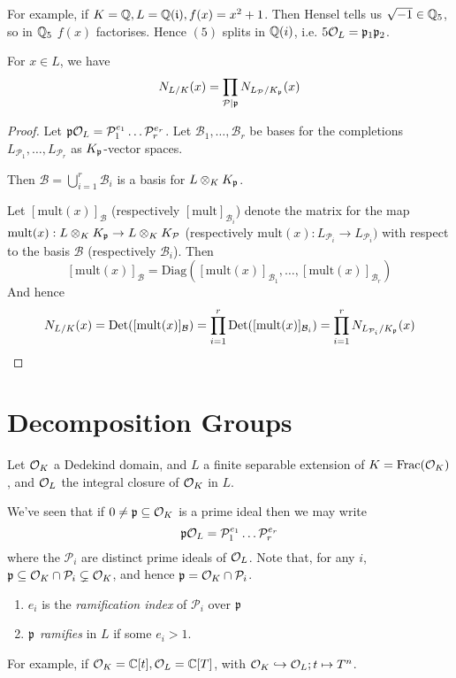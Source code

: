 \documentclass[10pt,a4paper]{article}
\begin{document}
For example, if $K = \mathbb{Q}, L= \mathbb{Q}(\mathfrak{i}), f(x) = x^2+1$. Then Hensel tells us $\sqrt{-1} \in \mathbb{Q}_5$, so in $\mathbb{Q}_5$ $f(x)$ factorises. Hence $(5)$ splits in $\mathbb{Q}(i)$, i.e. $5 \mathcal{O}_L = \mathfrak{p}_1\mathfrak{p}_2$.
\begin{corollary}
  For $x \in L$, we have
  \[N_{L/K}(x) = \prod_{\mathcal{P}|\mathfrak{p}} N_{L_{\mathcal{P}}/K_{\mathfrak{p}}}(x)\]
\end{corollary}
\begin{proof}
  Let $\mathfrak{p}\mathcal{O}_L = \mathcal{P}_1^{e_1} \ldots \mathcal{P}_r^{e_r}$. Let $\mathcal{B}_1, \ldots, \mathcal{B}_r$ be bases for the completions $L_{\mathcal{P}_1}, \ldots, L_{\mathcal{P}_r}$ as $K_{\mathfrak{p}}$-vector spaces.

  Then $\mathcal{B} = \bigcup_{i=1}^r \mathcal{B}_i$ is a basis for $L \otimes_K K_{\mathfrak{p}}$.

  Let $[\text{mult}(x)]_\mathcal{B}$ (respectively $[\text{mult}]_{\mathcal{B}_i}$) denote the matrix for the map $\text{mult}(x):L\otimes_K K_{\mathfrak{p}} \to L\otimes_K K_\mathcal{P}$ (respectively $\text{mult}(x):L_{\mathcal{P}_i} \to L_{\mathcal{P}_i})$ with respect to the basis $\mathcal{B}$ (respectively $\mathcal{B}_i$). Then
  \[[\text{mult}(x)]_\mathcal{B} = \text{Diag}([\text{mult}(x)]_{\mathcal{B_1}}, \ldots, [\text{mult}(x)]_{\mathcal{B}_r})\]
  And hence
  \[N_{L/K}(x) = \operatorname{Det}([\text{mult}(x)]_\mathcal{B}) = \prod_{i=1}^r \operatorname{Det}([\text{mult}(x)]_{\mathcal{B}_i}) = \prod_{i=1}^r N_{L_{\mathcal{P}_i}/K_{\mathfrak{p}}}(x)\]
\end{proof}
\section{Decomposition Groups}
Let $\mathcal{O}_K$ a Dedekind domain, and $L$ a finite separable extension of $K = \operatorname{Frac}(\mathcal{O}_K)$, and $\mathcal{O}_L$ the integral closure of $\mathcal{O}_K$ in $L$.

We've seen that if $0 \neq \mathfrak{p} \subseteq \mathcal{O}_K$ is a prime ideal then we may write
\[\mathfrak{p}\mathcal{O}_L = \mathcal{P}_1^{e_1}\ldots \mathcal{P}_r^{e_r}\]
where the $\mathcal{P}_i$ are distinct prime ideals of $\mathcal{O}_L$. Note that, for any $i$, $\mathfrak{p} \subseteq \mathcal{O}_K \cap \mathcal{P}_i \subsetneq \mathcal{O}_K$, and hence $\mathfrak{p} = \mathcal{O}_K \cap \mathcal{P}_i$.

\begin{definition}\hspace*{0cm}
  \begin{enumerate}
    \item $e_i$ is the \emph{ramification index} of $\mathcal{P}_i$ over $\mathfrak{p}$
    \item $\mathfrak{p}$ \emph{ramifies} in $L$ if some $e_i > 1$.
  \end{enumerate}
\end{definition}
For example, if $\mathcal{O}_K = \mathbb{C}[t], \mathcal{O}_L = \mathbb{C}[T]$, with $\mathcal{O}_K \hookrightarrow \mathcal{O}_L; t\mapsto T^n$.
\end{document}
